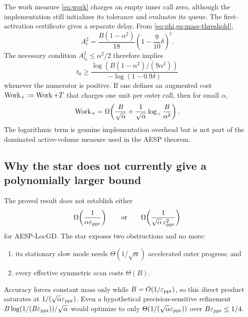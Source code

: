\documentclass[11pt]{article}
\begin{document}
The work measure \cref{eq:work} charges an empty inner call zero, although the
implementation still initializes its tolerance and evaluates its queue.  The
first-activation certificate gives a separate delay.  From
\cref{eq:phi,eq:mass-threshold},
\[
  A_t^2
  =\frac{B(1-\alpha^2)}{18}
    \left(1-\frac9{10}\delta\right)^t.
\]
The necessary condition $A_{t_0}^2\leq\alpha^2/2$ therefore implies
\begin{equation}
  t_0\geq
  \frac{
    \log\!\left(B(1-\alpha^2)/(9\alpha^2)\right)
  }{
    -\log(1-0.9\delta)
  }
  \label{eq:first-call-delay}
\end{equation}
whenever the numerator is positive.  If one defines an augmented cost
$\operatorname{Work}_+:=\operatorname{Work}+T$ that charges one unit per outer call, then for small
$\alpha$,
\begin{equation}
  \operatorname{Work}_+
  =\Omega\!\left(
     \frac{B}{\sqrt\alpha}
     +\frac1{\sqrt\alpha}
      \log_+\frac{B}{\alpha^2}
   \right).
  \label{eq:augmented-work}
\end{equation}
The logarithmic term is genuine implementation overhead but is not part of
the dominated active-volume measure used in the AESP theorem.

\subsection{Why the star does not currently give a polynomially larger bound}

The proved result does not establish either
\[
  \Omega\!\left(\frac1{\alpha\varepsilon_{\mathrm{ppr}}}\right)
  \qquad\text{or}\qquad
  \Omega\!\left(\frac1{\sqrt\alpha\,\varepsilon_{\mathrm{ppr}}^2}\right)
\]
for AESP-LocGD.  The star exposes two obstructions and no more:
\begin{enumerate}[leftmargin=*]
\item its stationary slow mode needs $\Theta(1/\sqrt\alpha)$ accelerated
      outer progress; and
\item every effective symmetric scan costs $\Theta(B)$.
\end{enumerate}
Accuracy forces constant mass only while $B=O(1/\varepsilon_{\mathrm{ppr}})$, so this direct
product saturates at $1/(\sqrt\alpha\varepsilon_{\mathrm{ppr}})$.  Even a hypothetical
precision-sensitive refinement
$B\log(1/(B\varepsilon_{\mathrm{ppr}}))/\sqrt\alpha$ would optimize to only
$\Theta(1/(\sqrt\alpha\varepsilon_{\mathrm{ppr}}))$ over $B\varepsilon_{\mathrm{ppr}}\leq1/4$.
\end{document}
